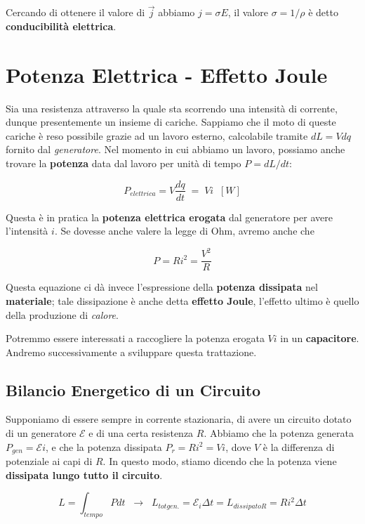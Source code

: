 Cercando di ottenere il valore di $\vec{j}$ abbiamo $j = \sigma E$, il valore $\sigma = 1/\rho$ è detto \textbf{conducibilità elettrica}. 

\section{Potenza Elettrica - Effetto Joule}
Sia una resistenza attraverso la quale sta scorrendo una intensità di corrente, dunque presentemente un insieme di cariche. Sappiamo che il moto di queste cariche è reso possibile grazie ad un lavoro esterno, calcolabile tramite $dL = Vdq$ fornito dal \textit{generatore}. Nel momento in cui abbiamo un lavoro, possiamo anche trovare la \textbf{potenza} data dal lavoro per unità di tempo $P = dL/dt$: 

\begin{equation} \label{eq_potenza_elettrica}
	P_{elettrica} = V\frac{dq}{dt} \; = \; Vi \; \; [W]
\end{equation}

Questa è in pratica la \textbf{potenza elettrica erogata} dal generatore per avere l'intensità $i$. Se dovesse anche valere la legge di Ohm, avremo anche che 

\begin{equation}
	P = Ri^2 = \frac{V^2}{R}
\end{equation}

Questa equazione ci dà invece l'espressione della \textbf{potenza dissipata} nel \textbf{materiale}; tale dissipazione è anche detta \textbf{effetto Joule}, l'effetto ultimo è quello della produzione di \textit{calore}.

Potremmo essere interessati a raccogliere la potenza erogata $Vi$ in un \textbf{capacitore}. Andremo successivamente a sviluppare questa trattazione.

\subsection{Bilancio Energetico di un Circuito}
Supponiamo di essere sempre in corrente stazionaria, di avere un circuito dotato di un generatore $\mathcal{E}$ e di una certa resistenza $R$. Abbiamo che la potenza generata $P_{gen} = \mathcal{E}i$, e che la potenza dissipata $P_r = Ri^2 = Vi$, dove $V$ è la differenza di potenziale ai capi di $R$. In questo modo, stiamo dicendo che la potenza viene \textbf{dissipata lungo tutto il circuito}. 

$$
L = \int_{tempo} Pdt  \; \; \longrightarrow \;\; L_{tot gen.} = \mathcal{E}_i \Delta t = L_{dissipato R} = Ri^2 \Delta t
$$

